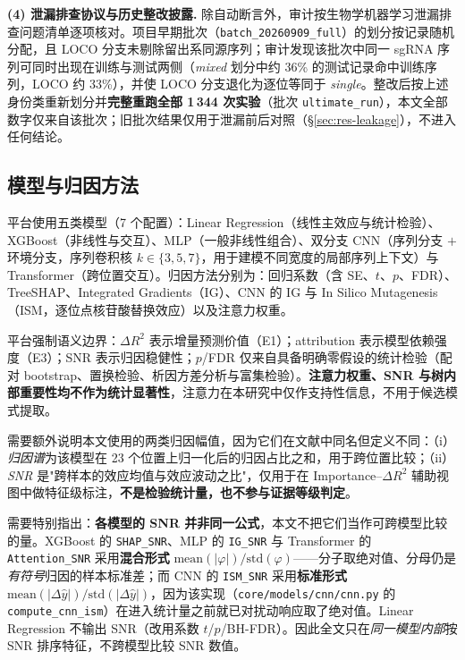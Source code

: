 \textbf{(4) 泄漏排查协议与历史整改披露.} 除自动断言外，审计按生物学机器学习泄漏排查问题清单逐项核对\citep{Bernett2024NatMethods,Kapoor2023Patterns}。项目早期批次（\texttt{batch\_20260909\_full}）的划分按记录随机分配，且 LOCO 分支未剔除留出系同源序列；审计发现该批次中同一 sgRNA 序列可同时出现在训练与测试两侧（\emph{mixed} 划分中约 36\% 的测试记录命中训练序列，LOCO 约 33\%），并使 LOCO 分支退化为逐位等同于 \emph{single}。整改后按上述身份类重新划分并\textbf{完整重跑全部 1\,344 次实验}（批次 \texttt{ultimate\_run}），本文全部数字仅来自该批次；旧批次结果仅用于泄漏前后对照（\S\ref{sec:res-leakage}），不进入任何结论。

\subsection{模型与归因方法}

平台使用五类模型（7 个配置）：Linear Regression（线性主效应与统计检验）、XGBoost（非线性与交互\citep{Chen2016KDD}）、MLP（一般非线性组合）、双分支 CNN（序列分支 $+$ 环境分支，序列卷积核 $k\in\{3,5,7\}$，用于建模不同宽度的局部序列上下文）与 Transformer（跨位置交互\citep{Vaswani2017NeurIPS}）。归因方法分别为：回归系数（含 SE、$t$、$p$、FDR）、TreeSHAP\citep{Lundberg2017NeurIPS,Lundberg2020NatMachIntell}、Integrated Gradients（IG）\citep{Sundararajan2017ICML}、CNN 的 IG 与 In Silico Mutagenesis（ISM，逐位点核苷酸替换效应）\citep{Nair2022Bioinformatics,Zhou2015NatMethods}以及注意力权重。

平台强制语义边界：$\Delta R^{2}$ 表示增量预测价值（E1）；attribution 表示模型依赖强度（E3）；SNR 表示归因稳健性；$p$/FDR 仅来自具备明确零假设的统计检验（配对 bootstrap、置换检验、析因方差分析与富集检验）。\textbf{注意力权重、SNR 与树内部重要性均不作为统计显著性}，注意力在本研究中仅作支持性信息，不用于候选模式提取。

需要额外说明本文使用的两类归因幅值，因为它们在文献中同名但定义不同：（i）\emph{归因谱}为该模型在 23 个位置上归一化后的归因占比之和，用于跨位置比较；（ii）\emph{SNR} 是"跨样本的效应均值与效应波动之比"，仅用于在 Importance--$\Delta R^{2}$ 辅助视图中做特征级标注，\textbf{不是检验统计量，也不参与证据等级判定}。

需要特别指出：\textbf{各模型的 SNR 并非同一公式}，本文不把它们当作可跨模型比较的量。XGBoost 的 \texttt{SHAP\_SNR}、MLP 的 \texttt{IG\_SNR} 与 Transformer 的 \texttt{Attention\_SNR} 采用\textbf{混合形式} $\mathrm{mean}(|\varphi|)/\mathrm{std}(\varphi)$——分子取绝对值、分母仍是\emph{有符号}归因的样本标准差；而 CNN 的 \texttt{ISM\_SNR} 采用\textbf{标准形式} $\mathrm{mean}(|\Delta\hat{y}|)/\mathrm{std}(|\Delta\hat{y}|)$，因为该实现（\texttt{core/models/cnn/cnn.py} 的 \texttt{compute\_cnn\_ism}）在进入统计量之前就已对扰动响应取了绝对值。Linear Regression 不输出 SNR（改用系数 $t$/$p$/BH-FDR）。因此全文只在\emph{同一模型内部}按 SNR 排序特征，不跨模型比较 SNR 数值。

